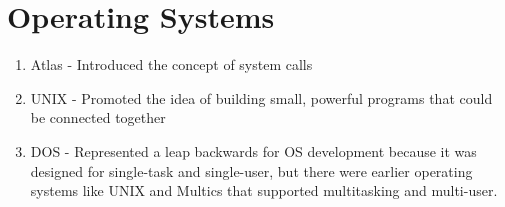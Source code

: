 \documentclass{article}
\begin{document}
\section*{Operating Systems}
\begin{enumerate}
    \item Atlas - Introduced the concept of system calls
    \item UNIX - Promoted the idea of building small, powerful programs that could be connected together
    \item DOS - Represented a leap backwards for OS development because it was designed for single-task and single-user, but there were earlier operating systems like UNIX and Multics that supported multitasking and multi-user.
\end{enumerate}
\end{document}
